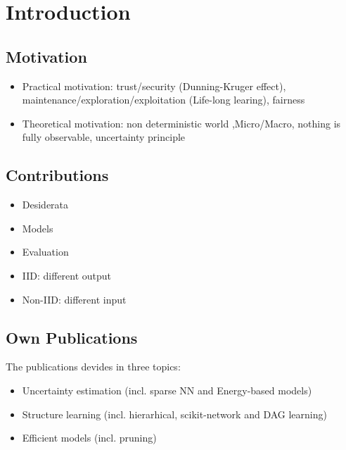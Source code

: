\chapter{Introduction}
\label{chap:introduction}

\section{Motivation}

\begin{itemize}
\item Practical motivation: trust/security (Dunning-Kruger effect), maintenance/exploration/exploitation (Life-long learing), fairness
\item Theoretical motivation: non deterministic world ,Micro/Macro, nothing is fully observable, uncertainty principle
\end{itemize}

\section{Contributions}

\begin{itemize}
    \item Desiderata
    \item Models
    \item Evaluation
\end{itemize}

\begin{itemize}
    \item IID: different output
    \item Non-IID: different input
\end{itemize}

\section{Own Publications}

The publications devides in three topics:
\begin{itemize}
\item Uncertainty estimation (incl. sparse NN and Energy-based models)
\item Structure learning (incl. hierarhical, scikit-network and DAG learning)
\item Efficient models (incl. pruning)
\end{itemize}